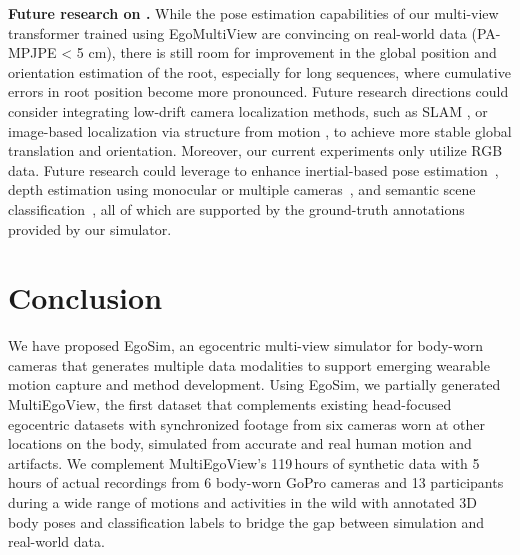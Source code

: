 \noindent\textbf{Future research on \dataset{}.}  
While the pose estimation capabilities of our multi-view transformer trained using EgoMultiView are convincing on real-world data (PA-MPJPE < 5 cm), there is still room for improvement in the global position and orientation estimation of the root, especially for long sequences, where cumulative errors in root position become more pronounced. Future research directions could consider integrating low-drift camera localization methods, such as SLAM \cite{teed2021droidslam}, or image-based localization via structure from motion \cite{colmap}, to achieve more stable global translation and orientation. 
Moreover, our current experiments only utilize RGB data. Future research could leverage \dataset{} to enhance inertial-based pose estimation~\cite{huang2018deep}, depth estimation using monocular or multiple cameras~\cite{zhao2020monocular}, and semantic scene classification~\cite{dai20183dmv}, all of which are supported by the ground-truth annotations provided by our simulator.






\section{Conclusion}
We have proposed EgoSim, an egocentric multi-view simulator for body-worn cameras that generates multiple data modalities to support emerging wearable motion capture and method development.
Using EgoSim, we partially generated MultiEgoView, the first dataset that complements existing head-focused egocentric datasets with synchronized footage from six cameras worn at other locations on the body, simulated from accurate and real human motion and artifacts.
We complement MultiEgoView's 119\,hours of synthetic data with 5\,hours of actual recordings from 6 body-worn GoPro cameras and 13 participants during a wide range of motions and activities in the wild with annotated 3D body poses and classification labels to bridge the gap between simulation and real-world data.

